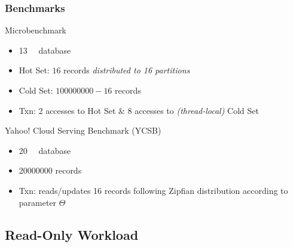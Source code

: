 \begin{frame}
	\frametitle{Benchmarks}
	
	\begin{block}{Microbenchmark}
		\vspace{-.5em}
		\begin{itemize}
			\item	\SI{13}{\giga\byte} database
			\item	Hot Set: $16$ records \emph{distributed to 16 partitions}
			\item	Cold Set: $\num{100000000} - 16$ records
			\item	Txn: 2 accesses to Hot Set \& 8 accesses to \emph{(thread-local)} Cold Set
		\end{itemize}
	\end{block}
	\vspace{-.25em}	
	\begin{block}{Yahoo! Cloud Serving Benchmark (YCSB)}
		\vspace{-.5em}
		\begin{itemize}
			\item	\SI{20}{\giga\byte} database
			\item	\num{20000000} records
			\item	Txn: reads/updates 16 records following Zipfian distribution according to parameter $\Theta$
		\end{itemize}
	\end{block}
\end{frame}

\subsection[Read-Only Workload]{Read-Only Workload} \label{subsec:read}

